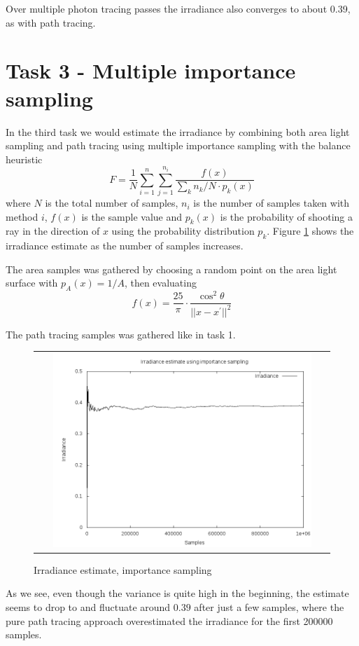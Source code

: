 \documentclass{article} %
\begin{document}
Over multiple photon tracing passes the irradiance also converges to about 0.39, as with path tracing.

\section*{Task 3 - Multiple importance sampling}
In the third task we would estimate the irradiance by combining both area light sampling and path tracing using multiple importance sampling with the balance heuristic
$$
F = \frac{1}{N}\sum_{i=1}^n \sum_{j=1}^{n_i} \frac{f(x)}{\sum_k n_k/N \cdot p_k(x)}
$$
where $N$ is the total number of samples, $n_i$ is the number of samples taken with method $i$, $f(x)$ is the sample value and $p_k(x)$ is the probability of shooting a ray in the direction of $x$ using the probability distribution $p_k$. Figure \ref{fig:importance} shows the irradiance estimate as the number of samples increases. 

The area samples was gathered by choosing a random point on the area light surface with $p_A(x)=1/A$, then evaluating
$$
f(x) = \frac{25}{\pi} \cdot \frac{\cos^2 \theta}{||x-x^\prime||^2}
$$

The path tracing samples was gathered like in task 1.

\begin{figure}[h]
\begin{tabular}{c}
\includegraphics[width=0.9\textwidth]{plots/irrad_importance.png}\\
\end{tabular}
\caption{Irradiance estimate, importance sampling}
\label{fig:importance}
\end{figure}

As we see, even though the variance is quite high in the beginning, the estimate seems to drop to and fluctuate around $0.39$ after just a few samples, where the pure path tracing approach overestimated the irradiance for the first 200000 samples.
\end{document}
